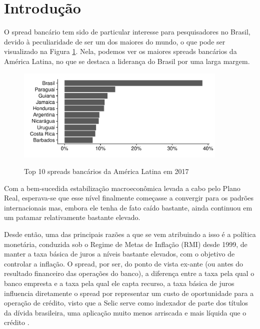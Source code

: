 \documentclass[a4paper, article, 12pt, openany, oneside, english, brazil]{abntex2}
\begin{document}

\tableofcontents*
\clearpage

\textual

\pagestyle{fancy}
\renewcommand{\headrulewidth}{0pt}

\section{Introdução}

    O spread bancário tem sido de particular interesse para pesquisadores no Brasil, devido à peculiaridade de ser um dos maiores do mundo, o que pode ser visualizado na Figura \ref{spreadal}. Nela, podemos ver os maiores spreads bancários da América Latina, no que se destaca a liderança do Brasil por uma larga margem.

\begin{figure}[h]
  \centering
    \caption{Top 10 spreads bancários da América Latina em 2017}
      \includegraphics[width = 0.9\textwidth, scale=1]{spread_AL.pdf}
      \label{spreadal}
\end{figure}
    
    Com a bem-sucedida estabilização macroeconômica levada a cabo pelo Plano Real, esperava-se que esse nível finalmente começasse a convergir para os padrões internacionais mas, embora ele tenha de fato caído bastante, ainda continuou em um patamar relativamente bastante elevado.

    Desde então, uma das principais razões a que se vem atribuindo a isso é a política monetária, conduzida sob o Regime de Metas de Inflação (RMI) desde 1999, de manter a taxa básica de juros a níveis bastante elevados, com o objetivo de controlar a inflação. O spread, por ser, do ponto de vista ex-ante (ou antes do resultado financeiro das operações do banco), a diferença entre a taxa pela qual o banco empresta e a taxa pela qual ele capta recurso, a taxa básica de juros influencia diretamente o spread por representar um custo de oportunidade para a operação de crédito, visto que a Selic serve como indexador de parte dos títulos da dívida brasileira, uma aplicação muito menos arriscada e mais líquida que o crédito \cite[p.~7]{manhica12}.
\end{document}
